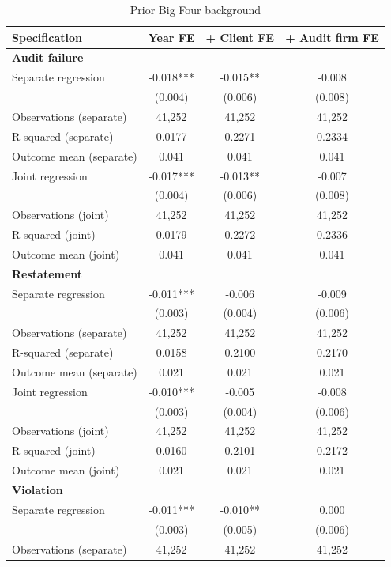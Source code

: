 \begin{table}[htbp]
\footnotesize
\centering
\caption{Prior Big Four background}
\begin{threeparttable}
\begin{tabular}{p{}ccc}
\toprule
Specification & Year FE & + Client FE & + Audit firm FE \\
\midrule
\multicolumn{4}{l}{\textbf{Audit failure}} \\
Separate regression & -0.018*** & -0.015** & -0.008 \\
 & (0.004) & (0.006) & (0.008) \\
Observations (separate) & 41,252 & 41,252 & 41,252 \\
R-squared (separate) & 0.0177 & 0.2271 & 0.2334 \\
Outcome mean (separate) & 0.041 & 0.041 & 0.041 \\
Joint regression & -0.017*** & -0.013** & -0.007 \\
 & (0.004) & (0.006) & (0.008) \\
Observations (joint) & 41,252 & 41,252 & 41,252 \\
R-squared (joint) & 0.0179 & 0.2272 & 0.2336 \\
Outcome mean (joint) & 0.041 & 0.041 & 0.041 \\
\multicolumn{4}{l}{\textbf{Restatement}} \\
Separate regression & -0.011*** & -0.006 & -0.009 \\
 & (0.003) & (0.004) & (0.006) \\
Observations (separate) & 41,252 & 41,252 & 41,252 \\
R-squared (separate) & 0.0158 & 0.2100 & 0.2170 \\
Outcome mean (separate) & 0.021 & 0.021 & 0.021 \\
Joint regression & -0.010*** & -0.005 & -0.008 \\
 & (0.003) & (0.004) & (0.006) \\
Observations (joint) & 41,252 & 41,252 & 41,252 \\
R-squared (joint) & 0.0160 & 0.2101 & 0.2172 \\
Outcome mean (joint) & 0.021 & 0.021 & 0.021 \\
\multicolumn{4}{l}{\textbf{Violation}} \\
Separate regression & -0.011*** & -0.010** & 0.000 \\
 & (0.003) & (0.005) & (0.006) \\
Observations (separate) & 41,252 & 41,252 & 41,252 \\

\end{tabular}
\end{threeparttable}
\end{table}
